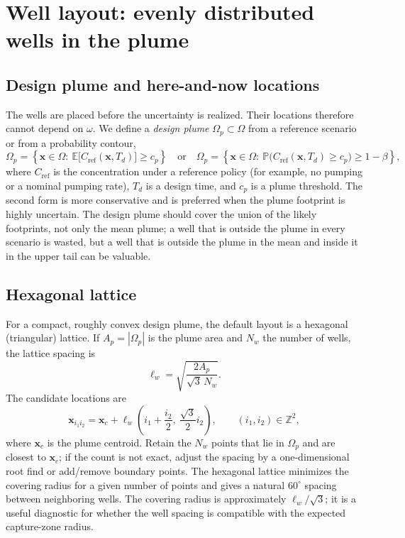 \documentclass[11pt]{article}
\numberwithin{equation}{section}
\newcommand{\E}{\mathbb{E}}
\newcommand{\Prob}{\mathbb{P}}
\newcommand{\abs}[1]{\left\lvert #1 \right\rvert}
\newcommand{\xx}{\mathbf{x}}
\theoremstyle{plain}
\begin{document}
\section{Well layout: evenly distributed wells in the plume}
\label{sec:wells}

\subsection{Design plume and here-and-now locations}

The wells are placed before the uncertainty is realized.  Their locations
therefore cannot depend on $\omega$.  We define a \emph{design plume}
$\Omega_p\subset\Omega$ from a reference scenario or from a probability
contour,
\begin{equation}
\label{eq:designplume}
\Omega_p
=\left\{\xx\in\Omega:\ \E\bigl[C_{\mathrm{ref}}(\xx,T_d)\bigr]\ge c_p\right\}
\quad\text{or}\quad
\Omega_p
=\left\{\xx\in\Omega:\ \Prob\bigl(C_{\mathrm{ref}}(\xx,T_d)\ge c_p\bigr)
\ge1-\beta\right\},
\end{equation}
where $C_{\mathrm{ref}}$ is the concentration under a reference policy (for
example, no pumping or a nominal pumping rate), $T_d$ is a design time, and
$c_p$ is a plume threshold.  The second form is more conservative and is
preferred when the plume footprint is highly uncertain.  The design plume
should cover the union of the likely footprints, not only the mean plume; a
well that is outside the plume in every scenario is wasted, but a well that is
outside the plume in the mean and inside it in the upper tail can be valuable.

\subsection{Hexagonal lattice}

For a compact, roughly convex design plume, the default layout is a hexagonal
(triangular) lattice.  If $A_p=\abs{\Omega_p}$ is the plume area and $N_w$ the
number of wells, the lattice spacing is
\begin{equation}
\label{eq:hexspacing}
\ell_w=\sqrt{\frac{2A_p}{\sqrt{3}\,N_w}}.
\end{equation}
The candidate locations are
\begin{equation}
\label{eq:hexpoints}
\xx_{i_1i_2}
=\xx_c+\ell_w\left(i_1+\frac{i_2}{2},\ \frac{\sqrt{3}}{2}i_2\right),
\qquad (i_1,i_2)\in\mathbb{Z}^2,
\end{equation}
where $\xx_c$ is the plume centroid.  Retain the $N_w$ points that lie in
$\Omega_p$ and are closest to $\xx_c$; if the count is not exact, adjust the
spacing by a one-dimensional root find or add/remove boundary points.  The
hexagonal lattice minimizes the covering radius for a given number of points
and gives a natural $60^\circ$ spacing between neighboring wells.  The
covering radius is approximately $\ell_w/\sqrt{3}$; it is a useful diagnostic
for whether the well spacing is compatible with the expected capture-zone
radius.
\end{document}
